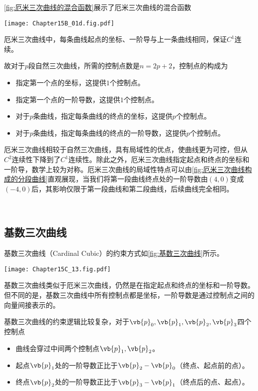 \cref{fig:厄米三次曲线的混合函数}展示了厄米三次曲线的混合函数
\begin{Figure}[厄米三次曲线的混合函数]
    \texttt{[image: Chapter15B\_01d.fig.pdf]}
\end{Figure}

厄米三次曲线中，每条曲线起点的坐标、一阶导与上一条曲线相同，保证$C^1$连续。

故对于$p$段自然三次曲线，所需的控制点数是$n=2p+2$，控制点的构成为
\begin{itemize}
    \item 指定第一个点的坐标，这提供$1$个控制点。
    \item 指定第一个点的一阶导数，这提供$1$个控制点。
    \item 对于$p$条曲线，指定每条曲线的终点的坐标，这提供$p$个控制点。
    \item 对于$p$条曲线，指定每条曲线的终点的一阶导数，这提供$p$个控制点。
\end{itemize}
厄米三次曲线相较于自然三次曲线，具有局域性的优点，使曲线更为可控，但从$C^2$连续性下降到了$C^1$连续性。除此之外，厄米三次曲线指定起点和终点的坐标和一阶导，数学上较为对称。厄米三次曲线的局域性特点可以由\cref{fig:厄米三次曲线构成的分段曲线}直观展现，当我们将第一段曲线终点处的一阶导数由$(4,0)$变成$(-4,0)$后，其影响仅限于第一段曲线和第二段曲线，后续曲线完全相同。

\begin{Figure}[厄米三次曲线构成的分段曲线]
        \\ \vspace{0.25cm}
\end{Figure}

\subsection{基数三次曲线}
基数三次曲线（Cardinal Cubic）的约束方式如\cref{fig:基数三次曲线}所示。

\begin{Figure}[基数三次曲线]
    \texttt{[image: Chapter15C\_13.fig.pdf]}
\end{Figure}

基数三次曲线类似于厄米三次曲线，仍然是在指定起点和终点的坐标和一阶导数。但不同的是，基数三次曲线中所有控制点都是坐标，一阶导数是通过控制点之间的向量间接表示的。

基数三次曲线的约束逻辑比较复杂，对于$\vb{p}_0,\vb{p}_1,\vb{p}_2,\vb{p}_3$四个控制点
\begin{itemize}
    \item 曲线会穿过中间两个控制点$\vb{p}_1,\vb{p}_2$。
    \item 起点$\vb{p}_1$处的一阶导数正比于$\vb{p}_2-\vb{p}_0$（终点、起点前的点）。
    \item 终点$\vb{p}_2$处的一阶导数正比于$\vb{p}_3-\vb{p}_1$（终点后的点、起点）。
\end{itemize}

